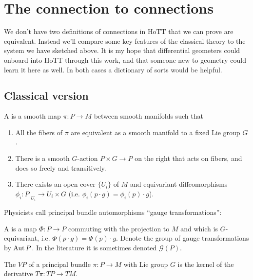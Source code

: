 \section{The connection to connections}

We don't have two definitions of connections in HoTT that we can prove are equivalent. Instead we'll compare some key features of the classical theory to the system we have sketched above. It is my hope that differential geometers could onboard into HoTT through this work, and that someone new to geometry could learn it here as well. In both cases a dictionary of sorts would be helpful.

\subsection{Classical version}

\begin{mydef}
A  is a smooth map \( \pi:P\to M \) between smooth manifolds such that
\begin{enumerate}
\item All the fibers of \( \pi \) are equivalent as a smooth manifold to a fixed Lie group \( G \).
\item There is a smooth \( G \)-action \( P\times G\to P \) on the right that acts on fibers, and does so freely and transitively.
\item There exists an open cover \( \{U_i\} \) of \( M \) and equivariant diffeomorphisms \( \phi_i:P|_{U_i}\to U_i\times G \) (i.e. \( \phi_i(p\cdot g)= \phi_i(p)\cdot g\)).
\end{enumerate}
\end{mydef}

Physicists call principal bundle automorphisms ``gauge transformations'':

\begin{mydef}
A  is a map \( \Phi:P\to P \) commuting with the projection to \( M \) and which is \( G \)-equivariant, i.e. \( \Phi(p\cdot g) = \Phi(p)\cdot g \). Denote the group of gauge transformations by \( \operatorname{Aut} P \). In the literature it is sometimes denoted \( \mathscr{G}(P) \).
\end{mydef}

\begin{mydef}
The  \( VP \) of a principal bundle \( \pi:P\to M \) with Lie group \( G \) is the kernel of the derivative \( T\pi:TP\to TM \).
\end{mydef}

